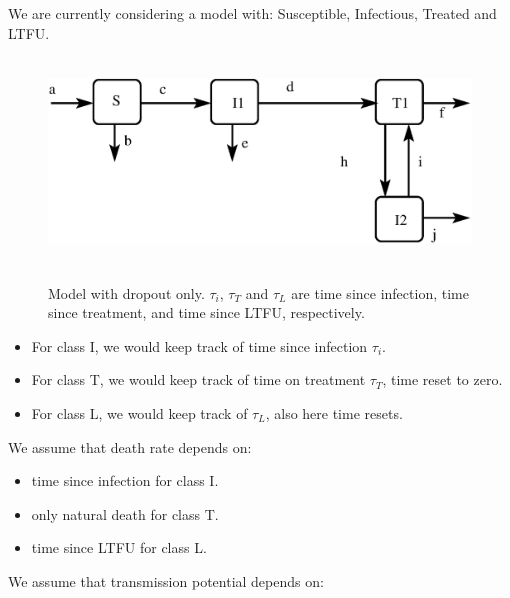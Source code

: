 \documentclass[a4paper,12pt]{article}
\begin{document}
We are currently considering a model with: Susceptible, Infectious, Treated and LTFU.

\begin{figure}[!ht]
 \begin{center}
\centering
{
 \includegraphics[width=14.5cm, height=5.5cm]{HIVModel_Dropout_ONLY.eps}
}
\end{center}
\caption{Model with dropout only. $\tau_i$, $\tau_T$ and $\tau_L$ are time since infection, time since treatment, and time since LTFU, respectively.}
\label{HIVmodel_SIT12}
\end{figure}

\begin{itemize}
 \item For class I, we would keep track of time since infection $\tau_i$.
 \item For class T, we would keep track of time on treatment $\tau_T$, time reset to zero.
 \item For class L, we would keep track of $\tau_L$, also here time resets.
\end{itemize}

We assume that death rate depends on:

\begin{itemize}
 \item time since infection for class I.
 \item only natural death for class T.
 \item time since LTFU for class L. 
\end{itemize}

We assume that transmission potential depends on:
\end{document}
